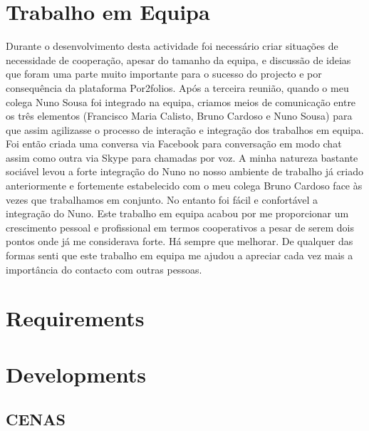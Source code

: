 \documentclass[a4paper,12pt,journal,twoside,compsoc]{PPIEEEtran}
\begin{document}

\section{Trabalho em Equipa}

Durante o desenvolvimento desta actividade foi necessário criar situações de necessidade de cooperação, apesar do tamanho da equipa, e discussão de ideias que foram uma parte muito importante para o sucesso do projecto e por consequência da plataforma Por2folios. Após a terceira reunião, quando o meu colega Nuno Sousa foi integrado na equipa, criamos meios de comunicação entre os três elementos (Francisco Maria Calisto, Bruno Cardoso e Nuno Sousa) para que assim agilizasse o processo de interação e integração dos trabalhos em equipa. Foi então criada uma conversa via Facebook para conversação em modo chat assim como outra via Skype para chamadas por voz. A minha natureza bastante sociável levou a forte integração do Nuno no nosso ambiente de trabalho já criado anteriormente e fortemente estabelecido com o meu colega Bruno Cardoso face às vezes que trabalhamos em conjunto. No entanto foi fácil e confortável a integração do Nuno. Este trabalho em equipa acabou por me proporcionar um crescimento pessoal e profissional em termos cooperativos a pesar de serem dois pontos onde já me considerava forte. Há sempre que melhorar. De qualquer das formas senti que este trabalho em equipa me ajudou a apreciar cada vez mais a importância do contacto com outras pessoas.

\section{Requirements}



\section{Developments}
\subsection{CENAS}


\end{document}

